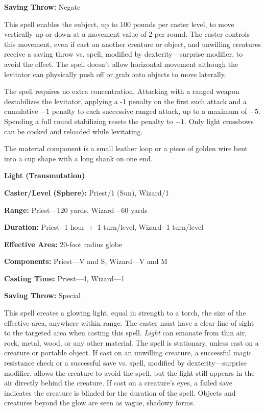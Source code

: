 \begin{multicols}{2}
\begin{minipage}{\columnwidth}
\noindent \textbf{Saving Throw:} Negate

\end{minipage}

This spell enables the subject, up to 100 pounds per caster level, to move vertically up or down at a movement value of 2 per round.  The caster controls this movement, even if cast on another creature or object, and unwilling creatures receive a saving throw vs. spell, modified by dexterity---surprise modifier, to avoid the effect.  The spell doesn't allow horizontal movement although the levitator can physically push off or grab onto objects to move laterally.

The spell requires no extra concentration.  Attacking with a ranged weapon destabilizes the levitator, applying a -1 penalty on the first such attack and a cumulative $-1$ penalty to each successive ranged attack, up to a maximum of $-5$.  Spending a full round stabilizing resets the penalty to $-1$.  Only light crossbows can be cocked and reloaded while levitating.

The material component is a small leather loop or a piece of golden wire bent into a cup shape with a long shank on one end.

\vspace{1em}

\noindent
\begin{minipage}{\columnwidth}

\noindent \textbf{Light (Transmutation)}

\noindent \textbf{Caster/Level (Sphere):} Priest/1 (Sun), Wizard/1

\noindent \textbf{Range:} Priest---120 yards, Wizard---60 yards

\noindent \textbf{Duration:} Priest- 1 hour~+~1 turn/level, Wizard- 1 turn/level

\noindent \textbf{Effective Area:} 20-foot radius globe

\noindent \textbf{Components:} Priest---V and S, Wizard---V and M

\noindent \textbf{Casting Time:} Priest---4, Wizard---1

\noindent \textbf{Saving Throw:} Special

\end{minipage}

This spell creates a glowing light, equal in strength to a torch, the size of the effective area, anywhere within range.  The caster must have a clear line of sight to the targeted area when casting this spell.  \textit{Light} can emanate from thin air, rock, metal, wood, or any other material.  The spell is stationary, unless cast on a creature or portable object.  If cast on an unwilling creature, a successful magic resistance check or a successful save vs. spell, modified by dexterity---surprise modifier, allows the creature to avoid the spell, but the light still appears in the air directly behind the creature.  If cast on a creature's eyes, a failed save indicates the creature is blinded for the duration of the spell.  Objects and creatures beyond the glow are seen as vague, shadowy forms. 


\end{multicols}
